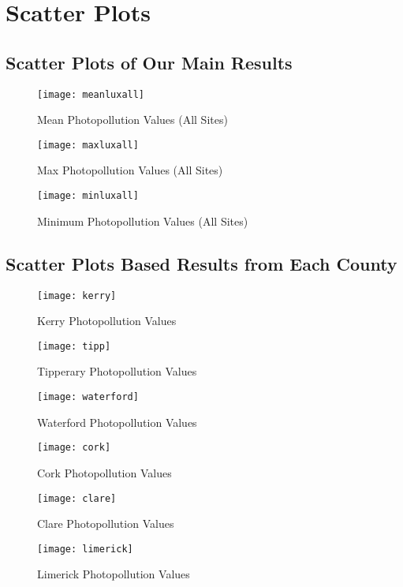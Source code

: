 \section{Scatter Plots}
\subsection{Scatter Plots of Our Main Results}
\begin{figure}[H]
    \centering
    \texttt{[image: meanluxall]}
    \caption{Mean Photopollution Values (All Sites)}
    \label{meanluxall}
\end{figure}
\begin{figure}[H]
    \centering
    \texttt{[image: maxluxall]}
    \caption{Max Photopollution Values (All Sites)}
    \label{maxluxall}
\end{figure}
\begin{figure}[H]
    \centering
    \texttt{[image: minluxall]}
    \caption{Minimum Photopollution Values (All Sites)}
    \label{minluxall}
\end{figure}
\hfill
\subsection{Scatter Plots Based Results from Each County}
\begin{figure}[H]
    \centering
    \texttt{[image: kerry]}
    \caption{Kerry Photopollution Values}
    \label{kerry}
\end{figure}
\begin{figure}[H]
    \centering
    \texttt{[image: tipp]}
    \caption{Tipperary Photopollution Values}
    \label{tipp}
\end{figure}
\hfill
\begin{figure}[H]
    \centering
    \texttt{[image: waterford]}
    \caption{Waterford Photopollution Values}
    \label{waterford}
\end{figure}
\begin{figure}[H]
    \centering
    \texttt{[image: cork]}
    \caption{Cork Photopollution Values}
    \label{cork}
\end{figure}
\hfill
\begin{figure}[H]
    \centering
    \texttt{[image: clare]}
    \caption{Clare Photopollution Values}
    \label{clare}
\end{figure}
\begin{figure}[H]
    \centering
    \texttt{[image: limerick]}
    \caption{Limerick Photopollution Values}
    \label{limerick}
\end{figure}

